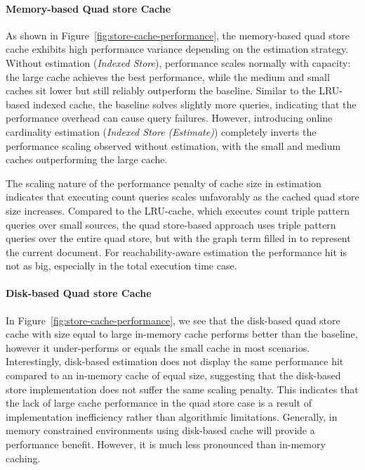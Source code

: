 \paragraph{Memory-based Quad store Cache}
As shown in Figure~\ref{fig:store-cache-performance}, 
the memory-based quad store cache exhibits high performance variance depending on the estimation strategy.
Without estimation (\textit{Indexed Store}), performance scales normally with capacity: 
the large cache achieves the best performance, while the medium and small caches sit lower 
but still reliably outperform the baseline. 
Similar to the LRU-based indexed cache, the baseline solves slightly more queries, indicating that the
performance overhead can cause query failures.
However, introducing online cardinality estimation (\textit{Indexed Store (Estimate)}) 
completely inverts the performance scaling observed without estimation, 
with the small and medium caches outperforming the large cache. 

The scaling nature of the performance penalty of cache size in estimation indicates that
executing count queries scales unfavorably as the cached quad store size increases.
Compared to the LRU-cache, which executes count triple pattern queries over small sources,
the quad store-based approach uses triple pattern queries over the entire quad store, but with
the graph term filled in to represent the current document.
For reachability-aware estimation the performance hit is not as big, especially in the
total execution time case.


\paragraph{Disk-based Quad store Cache}

In Figure~\ref{fig:store-cache-performance}, we see that the disk-based quad store cache with size equal
to large in-memory cache performs better than the baseline, however it under-performs or equals the small cache
in most scenarios. 
Interestingly, disk-based estimation does not display the same performance hit compared to an in-memory cache of equal size, 
suggesting that the disk-based store implementation does not suffer the same scaling penalty.
This indicates that the lack of large cache performance in the quad store case is a 
result of implementation inefficiency rather than algorithmic limitations.
Generally, in memory constrained environments using disk-based cache will provide a performance benefit. 
However, it is much less pronounced than in-memory caching.

